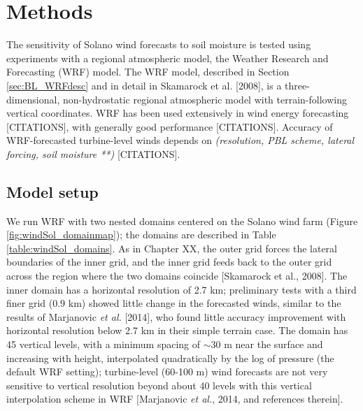
%
%
%
%
%

\section{Methods}

The sensitivity of Solano wind forecasts to soil moisture is tested using experiments with a regional atmospheric model, the Weather Research and Forecasting (WRF) model.  The WRF model, described in Section \ref{sec:BL_WRFdesc} and in detail in Skamarock et al. [2008], is a three-dimensional, non-hydrostatic regional atmospheric model with terrain-following vertical coordinates. WRF has been used extensively in wind energy forecasting [CITATIONS], with generally good performance [CITATIONS].  Accuracy of WRF-forecasted turbine-level winds depends on \textit{(resolution, PBL scheme, lateral forcing, soil moisture **)} [CITATIONS].

\subsection{Model setup}

We run WRF with two nested domains centered on the Solano wind farm (Figure \ref{fig:windSol_domainmap}); the domains are described in Table \ref{table:windSol_domains}.  As in Chapter XX, the outer grid forces the lateral boundaries of the inner grid, and the inner grid feeds back to the outer grid across the region where the two domains coincide [Skamarock et al., 2008].  The inner domain has a horizontal resolution of 2.7 km; preliminary tests with a third finer grid (0.9 km) showed little change in the forecasted winds, similar to the results of Marjanovic \textit{et al.} [2014], who found little accuracy improvement with horizontal resolution below 2.7 km in their simple terrain case.  The domain has 45 vertical levels, with a minimum spacing of $\sim$30 m near the surface and increasing with height, interpolated quadratically by the log of pressure (the default WRF setting); turbine-level (60-100 m) wind forecasts are not very sensitive to vertical resolution beyond about 40 levels with this vertical interpolation scheme in WRF [Marjanovic \textit{et al.}, 2014, and references therein].

